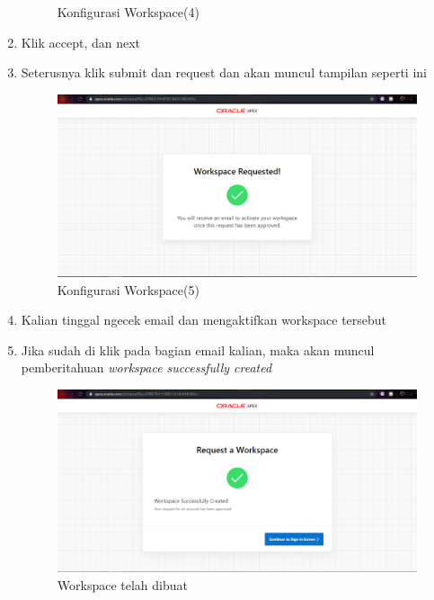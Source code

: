 \documentclass{article}
\begin{document}
\begin{enumerate}
\begin{figure}[!htbp]
        \caption{Konfigurasi Workspace(4)}
    \end{figure}
\newpage
    \item Klik accept, dan next
    \item Seterusnya klik submit dan request dan akan muncul tampilan seperti ini
    \begin{figure}[!htbp]
        \centering
        \includegraphics[scale=0.3]{6.PNG}
        \caption{Konfigurasi Workspace(5)}
    \end{figure}
    \item Kalian tinggal ngecek email dan mengaktifkan workspace tersebut
    \item Jika sudah di klik pada bagian email kalian, maka akan muncul pemberitahuan \textit{workspace successfully created}
    \begin{figure}[!htbp]
        \centering
        \includegraphics[scale=0.3]{7.PNG}
        \caption{Workspace telah dibuat}
    \end{figure}
\end{enumerate}
\newpage
\end{document}
